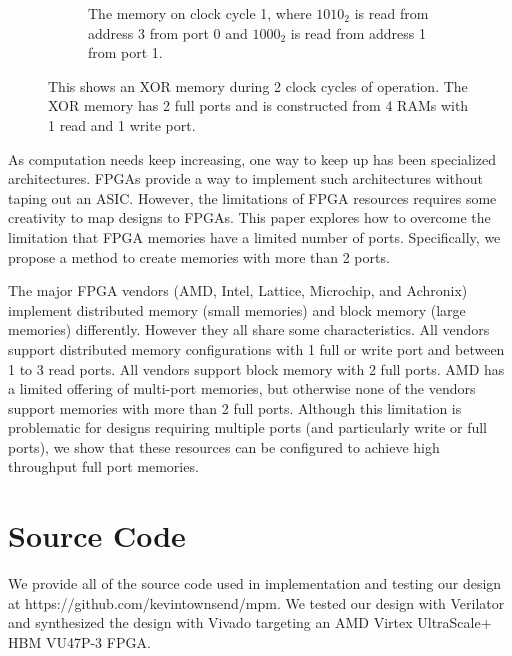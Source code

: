 \documentclass[sigconf,nonacm]{acmart}
\begin{document}
\begin{figure}
\begin{subfigure}[t]{0.45\textwidth}
    \caption{The memory on clock cycle 1, where $1010_2$ is read from address 3 from port 0 and $1000_2$ is read from address 1 from port 1.}
  \end{subfigure}
  \caption{This shows an XOR memory during 2 clock cycles of operation. The XOR memory has 2 full ports and is constructed from 4 RAMs with 1 read and 1 write port.}
  \label{fig:xor_example}
\end{figure}


As computation needs keep increasing, one way to keep up has been
specialized architectures. FPGAs provide a way to implement such architectures without taping out an ASIC.
However, the limitations of FPGA resources requires some creativity to map designs to FPGAs.
This paper explores how to overcome the limitation that FPGA memories have a limited number of
ports. Specifically, we propose a method to create memories with more than 2 ports.

The major FPGA vendors (AMD\cite{amd20}, Intel\cite{intel24}, Lattice\cite{lattice21}, Micro\-chip\cite{microchip_polarfire_fabric}, and Achronix\cite{achronix_ds015}) implement distributed memory (small memories) and block memory (large memories)
differently. However they all share some characteristics. All vendors support distributed memory configurations with 1 full or write port and between 1 to 3 read ports. All vendors support block memory with 2 full ports. AMD has a limited offering of multi-port memories, but otherwise none of the vendors support memories with more than 2 full ports. Although this limitation is problematic for designs requiring multiple ports (and particularly write or full ports), we show that these resources can be configured to achieve high throughput full port memories.

\section{Source Code}
We provide all of the source code used in implementation and testing our design at
https://github.com/kevintownsend/mpm. We tested our design with Verilator\cite{verilator_manual} and synthesized the design
with Vivado\cite{ug893} targeting an AMD Virtex UltraScale+ HBM VU47P-3 FPGA.
\end{document}
